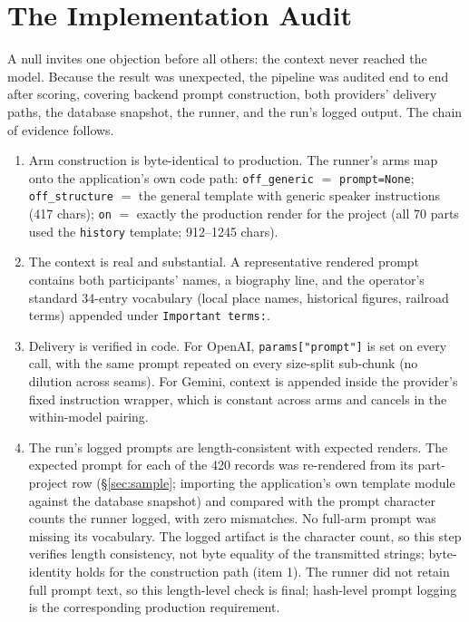 \documentclass[11pt]{article}
\begin{document}
\section{The Implementation Audit}
\label{sec:audit}

A null invites one objection before all others: the context never reached the model. Because the result was unexpected, the pipeline was audited end to end after scoring, covering backend prompt construction, both providers' delivery paths, the database snapshot, the runner, and the run's logged output. The chain of evidence follows.

\begin{enumerate}
\item Arm construction is byte-identical to production. The runner's arms map onto the application's own code path: \texttt{off\_generic} $=$ \texttt{prompt=None}; \texttt{off\_structure} $=$ the general template with generic speaker instructions (417 chars); \texttt{on} $=$ exactly the production render for the project (all 70 parts used the \texttt{history} template; 912--1245 chars).
\item The context is real and substantial. A representative rendered prompt contains both participants' names, a biography line, and the operator's standard 34-entry vocabulary (local place names, historical figures, railroad terms) appended under \texttt{Important terms:}.
\item Delivery is verified in code. For OpenAI, \texttt{params["prompt"]} is set on every call, with the same prompt repeated on every size-split sub-chunk (no dilution across seams). For Gemini, context is appended inside the provider's fixed instruction wrapper, which is constant across arms and cancels in the within-model pairing.
\item The run's logged prompts are length-consistent with expected renders. The expected prompt for each of the 420 records was re-rendered from its part-project row (\S\ref{sec:sample}; importing the application's own template module against the database snapshot) and compared with the prompt character counts the runner logged, with zero mismatches. No full-arm prompt was missing its vocabulary. The logged artifact is the character count, so this step verifies length consistency, not byte equality of the transmitted strings; byte-identity holds for the construction path (item 1). The runner did not retain full prompt text, so this length-level check is final; hash-level prompt logging is the corresponding production requirement.

\end{enumerate}
\end{document}
